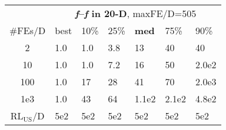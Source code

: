 \begin{tabular}{c|llllll}
 & \multicolumn{6}{|c}{\textbf{\textit{f}\raisebox{-0.35ex}{1}--\textit{f}\raisebox{-0.35ex}{24} in 20-D}, maxFE/D=505}\\
\#FEs/D & best & 10\% & 25\% & \textbf{med} & 75\% & 90\%\\
2 & \hspace*{1ex}1.0 & \hspace*{1ex}1.0 & \hspace*{1ex}3.8 & 13 & 40 & 40\\
10 & \hspace*{1ex}1.0 & \hspace*{1ex}1.0 & \hspace*{1ex}7.2 & 16 & 50 & 2.0e2\\
100 & \hspace*{1ex}1.0 & 17 & 28 & 41 & 70 & 2.0e3\\
1e3 & \hspace*{1ex}1.0 & 43 & 64 & 1.1e2 & 2.1e2 & 4.8e2\\
$\text{RL}_{\text{US}}$/D & 5e2 & 5e2 & 5e2 & 5e2 & 5e2 & 5e2
\end{tabular}
